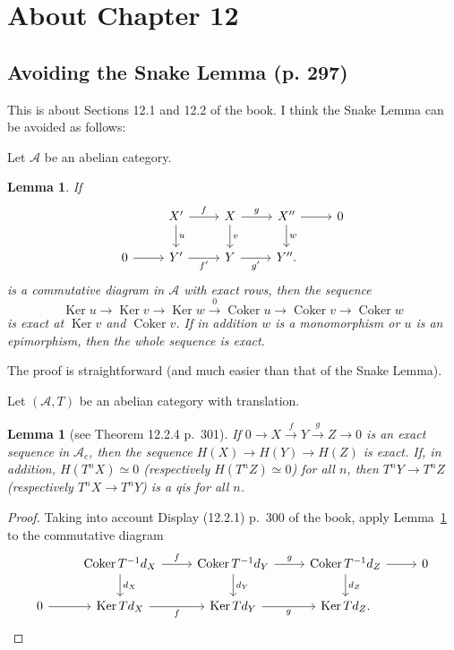 \documentclass[12pt]{article}%
\newtheorem{lem}[thm]{Lemma}
\theoremstyle{remark}
\theoremstyle{definition}
\newcommand{\A}{\mathcal A}
\newcommand{\xr}{\xrightarrow}
\DeclareMathOperator{\Coker}{Coker}
\DeclareMathOperator{\Ker}{Ker}
\begin{document}

\section{About Chapter 12}

\subsection{Avoiding the Snake Lemma (p. 297)}  

This is about Sections 12.1 and 12.2 of the book. I think the Snake Lemma can be avoided as follows: 

Let $\A$ be an abelian category. 

\begin{lem}\label{sl1}
If 
$$
\begin{tikzcd}
{}&X'\ar{d}{u}\ar{r}{f}&X\ar{d}{v}\ar{r}{g}&X''\ar{d}{w}\ar{r}&0\\ 
0\ar{r}&Y'\ar{r}[swap]{f'}&Y\ar{r}[swap]{g'}&Y''.
\end{tikzcd}
$$ 
is a commutative diagram in $\A$ with exact rows, then the sequence 
$$
\Ker u\to\Ker v\to\Ker w\xr0\Coker u\to\Coker v\to\Coker w
$$
is exact at $\Ker v$ and $\Coker v$. If in addition $w$ is a monomorphism or $u$ is an epimorphism, then the whole sequence is exact.
\end{lem}
%
The proof is straightforward (and much easier than that of the Snake Lemma). 

Let $(\A,T)$ be an abelian category with translation. 

\begin{lem}[see Theorem 12.2.4 p.~301]\label{sl2}
If $0\to X\xr fY\xr g Z\to0$ is an exact sequence in $\A_c$, then the sequence $H(X)\to H(Y)\to H(Z)$ is exact. If, in addition, $H(T^nX)\simeq0$ (respectively $H(T^nZ)\simeq0$) for all $n$, then $T^nY\to T^nZ$ (respectively $T^nX\to T^nY$) is a qis for all $n$. 
\end{lem}

\begin{proof}
Taking into account Display (12.2.1) p.~300 of the book, apply Lemma~\ref{sl1} to the commutative diagram 
$$
\begin{tikzcd}
{}&\Coker T^{-1}d_X\ar{d}{d_X}\ar{r}{f}&\Coker T^{-1}d_Y\ar{d}{d_Y}\ar{r}{g}&\Coker T^{-1}d_Z\ar{d}{d_Z}\ar{r}&0\\ 
0\ar{r}&\Ker Td_X\ar{r}[swap]{f}&\Ker Td_Y\ar{r}[swap]{g}&\Ker Td_Z.
\end{tikzcd}
$$ 
\end{proof}
\end{document}
